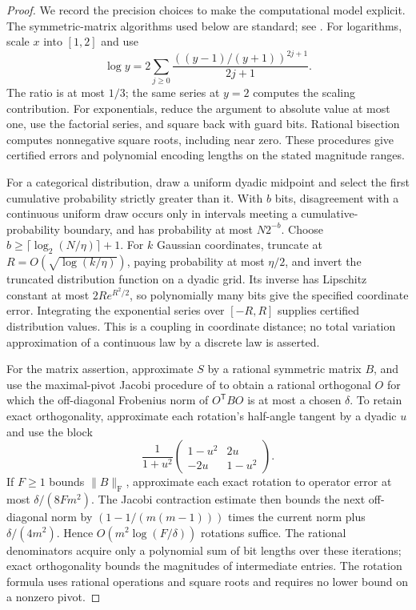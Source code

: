 \documentclass[11pt]{article}
\numberwithin{equation}{section}
\begin{document}
\begin{proof}
We record the precision choices to make the computational model explicit. The symmetric-matrix algorithms used below are standard; see \cite[Chapters~2, 8--9]{GV13}. For logarithms, scale $x$ into $[1,2]$ and use
\[
 \log y=2\sum_{j\ge0}\frac{((y-1)/(y+1))^{2j+1}}{2j+1}.
\]
The ratio is at most $1/3$; the same series at $y=2$ computes the scaling contribution. For exponentials, reduce the argument to absolute value at most one, use the factorial series, and square back with guard bits. Rational bisection computes nonnegative square roots, including near zero. These procedures give certified errors and polynomial encoding lengths on the stated magnitude ranges.

For a categorical distribution, draw a uniform dyadic midpoint and select the first cumulative probability strictly greater than it. With $b$ bits, disagreement with a continuous uniform draw occurs only in intervals meeting a cumulative-probability boundary, and has probability at most $N2^{-b}$. Choose $b\ge\lceil\log_2(N/\eta)\rceil+1$. For $k$ Gaussian coordinates, truncate at $R=O(\sqrt{\log(k/\eta)})$, paying probability at most $\eta/2$, and invert the truncated distribution function on a dyadic grid. Its inverse has Lipschitz constant at most $2Re^{R^2/2}$, so polynomially many bits give the specified coordinate error. Integrating the exponential series over $[-R,R]$ supplies certified distribution values. This is a coupling in coordinate distance; no total variation approximation of a continuous law by a discrete law is asserted.

For the matrix assertion, approximate $S$ by a rational symmetric matrix $B$, and use the maximal-pivot Jacobi procedure of \cite[\S8.5]{GV13} to obtain a rational orthogonal $O$ for which the off-diagonal Frobenius norm of $O^{\mathsf T}BO$ is at most a chosen $\delta$. To retain exact orthogonality, approximate each rotation's half-angle tangent by a dyadic $u$ and use the block
\[
 \frac1{1+u^2}\begin{pmatrix}1-u^2&2u\\-2u&1-u^2\end{pmatrix}.
\]
If $F\ge1$ bounds $\|B\|_{\mathrm F}$, approximate each exact rotation to operator error at most $\delta/(8Fm^2)$. The Jacobi contraction estimate then bounds the next off-diagonal norm by
$(1-1/(m(m-1)))$ times the current norm plus $\delta/(4m^2)$. Hence $O(m^2\log(F/\delta))$ rotations suffice. The rational denominators acquire only a polynomial sum of bit lengths over these iterations; exact orthogonality bounds the magnitudes of intermediate entries. The rotation formula uses rational operations and square roots and requires no lower bound on a nonzero pivot.


\end{proof}
\end{document}

